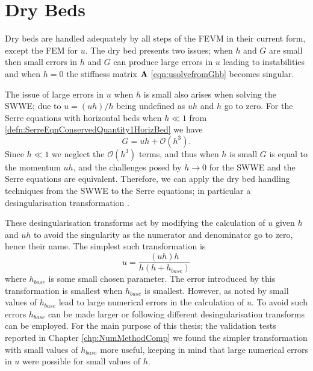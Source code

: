\section{Dry Beds}
Dry beds are handled adequately by all steps of the FEVM in their current form, except the FEM for $u$. The dry bed presents two issues; when $h$ and $G$ are small then small errors in $h$ and $G$ can produce large errors in $u$ leading to instabilities and when $h=0$ the stiffness matrix $\mathbf{A}$ \eqref{eqn:usolvefromGhb} becomes singular.

The issue of large errors in $u$ when $h$ is small also arises when solving the SWWE; due to $u = (uh)/h $ being undefined as $u h $ and $h$ go to zero. For the Serre equations with horizontal beds when $h \ll 1$ from \eqref{defn:SerreEqnConservedQuantity1HorizBed} we have
\begin{equation}
G = uh + \mathcal{O}\left(h^3\right).
\end{equation}
Since $h \ll 1$ we neglect the $\mathcal{O}\left(h^3\right)$ terms, and thus when $h$ is small $G$ is equal to the momentum $uh$, and the challenges posed by $h \rightarrow 0$ for the SWWE and the Serre equations are equivalent. Therefore, we can apply the dry bed handling techniques from the SWWE to the Serre equations; in particular a desingularisation transformation \cite{Kurganov-Petrova-2007-707}. 

These desingularisation transforms act by modifying the calculation of $u$ given $h$ and $uh$ to avoid the singularity as the numerator and denominator go to zero, hence their name. The simplest such transformation is
\begin{equation}
u = \frac{(uh) h}{h\left(h + h_{base}\right)}
\label{eqn:calculationofugivenuhandh}
\end{equation}
where $h_{base}$ is some small chosen parameter. The error introduced by this transformation is smallest when $h_{base}$ is smallest. However, as noted by \citet{Kurganov-Petrova-2007-707} small values of $h_{base}$ lead to large numerical errors in the calculation of $u$. To avoid such errors $h_{base}$ can be made larger or following \citet{Kurganov-Petrova-2007-707} different desingularisation transforms can be employed. For the main purpose of this thesis; the validation tests reported in Chapter \ref{chp:NumMethodComp} we found the simpler transformation with small values of $h_{base}$ more useful, keeping in mind that large numerical errors in $u$ were possible for small values of $h$. 


